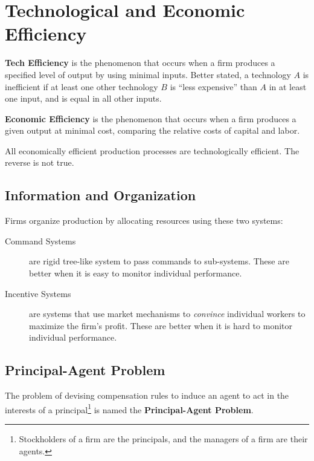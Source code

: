             \section{Technological and Economic Efficiency} %
            \label{sec:technological_and_economic_efficiency}
                \textbf{Tech Efficiency} is the phenomenon that occurs when a firm produces a specified level of output by using minimal inputs.
                Better stated, a technology $A$ is inefficient if at least one other technology $B$ is ``less expensive'' than $A$ in at least one input, and is equal in all other inputs.

                \textbf{Economic Efficiency} is the phenomenon that occurs when a firm produces a given output at minimal cost, comparing the relative costs of capital and labor.

                All economically efficient production processes are technologically efficient.
                The reverse is not true.

                \subsection{Information and Organization} %
                \label{sub:information_and_organization}
                    Firms organize production by allocating resources using these two systems:
                    \begin{description}
                        \item[Command Systems] are rigid tree-like system to pass commands to sub-systems.
                        These are better when it is easy to monitor individual performance.
                        \item[Incentive Systems] are systems that use market mechanisms to \textit{convince} individual workers to maximize the firm's profit.
                        These are better when it is hard to monitor individual performance.
                    \end{description}
                \subsection{Principal-Agent Problem} %
                \label{sub:principal_agent_problem}
                    The problem of devising compensation rules to induce an agent to act in the interests of a principal\footnote{Stockholders of a firm are the principals, and the managers of a firm are their agents.} is named the \textbf{Principal-Agent Problem}.


